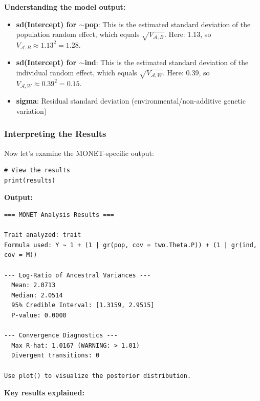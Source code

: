 \documentclass[11pt]{article}
\begin{document}
\textbf{Understanding the model output:}

\begin{itemize}
\item \textbf{sd(Intercept) for $\sim$pop}: This is the estimated standard deviation of the population random effect, which equals $\sqrt{V_{ \mathcal{A},B}}$. Here: 1.13, so $V_{ \mathcal{A},B} \approx 1.13^2 = 1.28$.

\item \textbf{sd(Intercept) for $\sim$ind}: This is the estimated standard deviation of the individual random effect, which equals $\sqrt{V_{ \mathcal{A},W}}$. Here: 0.39, so $V_{ \mathcal{A},W} \approx 0.39^2 = 0.15$.

\item \textbf{sigma}: Residual standard deviation (environmental/non-additive genetic variation)

\end{itemize}

\subsubsection{Interpreting the Results}

Now let's examine the MONET-specific output:

\begin{lstlisting}
# View the results
print(results)
\end{lstlisting}

\textbf{Output:}
\begin{verbatim}
=== MONET Analysis Results ===

Trait analyzed: trait 
Formula used: Y ~ 1 + (1 | gr(pop, cov = two.Theta.P)) + (1 | gr(ind, cov = M)) 

--- Log-Ratio of Ancestral Variances ---
  Mean: 2.0713
  Median: 2.0514
  95% Credible Interval: [1.3159, 2.9515]
  P-value: 0.0000

--- Convergence Diagnostics ---
  Max R-hat: 1.0167 (WARNING: > 1.01)
  Divergent transitions: 0

Use plot() to visualize the posterior distribution.
\end{verbatim}

\textbf{Key results explained:}
\end{document}
